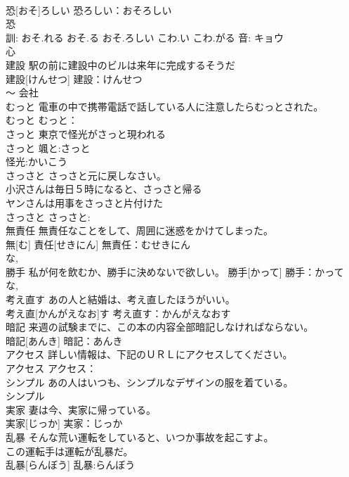 \documentclass[8pt]{extreport}
\begin{document}
\begin{CJK}{UTF8}{min}
\\	恐[おそ]ろしい			恐ろしい：おそろしい
\\	恐 
\\	訓: おそ.れる おそ.る おそ.ろしい こわ.い こわ.がる 音: キョウ 
\\	心 
\\	建設	駅の前に建設中のビルは来年に完成するそうだ 
\\	建設[けんせつ]			建設：けんせつ
\\	〜 会社 
\\	むっと	電車の中で携帯電話で話している人に注意したらむっとされた。 
\\	むっと			むっと：
\\	さっと	東京で怪光がさっと現われる 
\\	さっと			颯と:さっと
\\	怪光:かいこう
\\	さっさと	さっさと元に戻しなさい。 
\\	小沢さんは毎日５時になると、さっさと帰る 
\\	ヤンさんは用事をさっさと片付けた 
\\	さっさと			さっさと:
\\	無責任	無責任なことをして、周囲に迷惑をかけてしまった。 
\\	無[む] 責任[せきにん]			無責任：むせきにん
\\	な, 
\\	勝手	私が何を飲むか、勝手に決めないで欲しい。	勝手[かって]			勝手：かって
\\	な, 
\\	考え直す	あの人と結婚は、考え直したほうがいい。 
\\	考え直[かんがえなお]す			考え直す：かんがえなおす
\\	暗記	来週の試験までに、この本の内容全部暗記しなければならない。 
\\	暗記[あんき]			暗記：あんき
\\	アクセス	詳しい情報は、下記のＵＲＬにアクセスしてください。 
\\	アクセス			アクセス：
\\	シンプル	あの人はいつも、シンプルなデザインの服を着ている。 
\\	シンプル			
\\	実家	妻は今、実家に帰っている。 
\\	実家[じっか]			実家：じっか
\\	乱暴	そんな荒い運転をしていると、いつか事故を起こすよ。 
\\	この運転手は運転が乱暴だ。 
\\	乱暴[らんぼう]			乱暴:らんぼう

\end{CJK}
\end{document}
